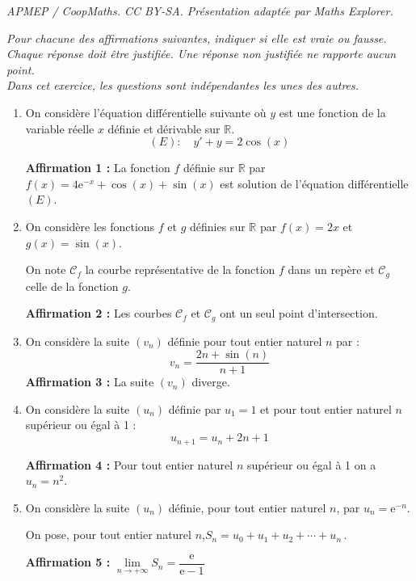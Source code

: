 \documentclass[10pt]{article}
\providecommand{\R}{\mathbb{R}}
\providecommand{\e}{{\mathrm{e}}}
\begin{document}
\noindent\textit{APMEP / CoopMaths. CC BY-SA. Présentation adaptée par Maths Explorer.}\par\medskip
\emph{Pour chacune des affirmations suivantes, indiquer si elle est vraie ou fausse.\\
		Chaque réponse doit être justifiée. Une réponse non justifiée ne rapporte aucun point.\\ Dans cet exercice, les questions sont indépendantes les unes des autres.}
	
	\begin{enumerate}[itemsep=5mm]
		\item On considère l'équation différentielle suivante où $y$ est une fonction de la variable réelle $x$ définie et dérivable sur $\R$.
		\[(E): \quad y'+y=2 \cos (x)\]
		
		\textbf{Affirmation 1 :} La fonction $f$ définie sur $\R$ par
		\quad $f(x)=4 \e^{-x}+\cos (x)+\sin (x)$\quad
		est solution de l'équation différentielle $(E)$.
		
		\item On considère les fonctions $f$ et $g$ définies sur $\R$ par \quad $f(x)=2 x$ \quad et \quad $g(x)=\sin (x)$.
		
		On note $\mathcal{C}_{f}$ la courbe représentative de la fonction $f$ dans un repère et $\mathcal{C}_{g}$ celle de la fonction $g$.
		
		\textbf{Affirmation 2 :} Les courbes $\mathcal{C}_{f}$ et $\mathcal{C}_{g}$ ont un seul point d'intersection.
		
		\item On considère la suite $(v_{n})$ définie pour tout entier naturel $n$ par :
		\[v_{n}=\dfrac{2 n+\sin (n)}{n+1}\]
		\textbf{Affirmation 3 :} La suite $\left(v_{n}\right)$ diverge.
		
		\item On considère la suite $(u_{n})$ définie par $u_{1}=1$ et pour tout entier naturel $n$ supérieur ou égal à 1 :
		\[u_{n+1}=u_{n}+2 n+1\]
		
		\textbf{Affirmation 4 :} Pour tout entier naturel $n$ supérieur ou égal à 1 on a $u_{n}=n^{2}$.
		
		\item On considère la suite $(u_{n})$ définie, pour tout entier naturel $n$, par $u_{n}=\e^{-n}$.
		
		On pose, pour tout entier naturel $n$,\quad $S_{n}=u_{0}+u_{1}+u_{2}+\cdots+u_{n}$\,.
		
		\textbf{Affirmation 5 :} $\lim\limits_{n \to +\infty} S_{n}=\dfrac{\e}{\e-1}$
	\end{enumerate}
\end{document}
